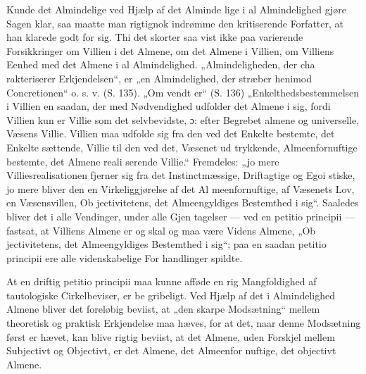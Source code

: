 \documentclass[12pt]{book}
\newcommand{\opage}[1]{\marginnote{\footnotesize\textit{[#1]}}}
\begin{document}
Kunde det Almindelige ved Hjælp af det Alminde\-%
lige i al Almindelighed gjøre Sagen klar, saa maatte
man rigtignok indrømme den kritiserende Forfatter, at
han klarede godt for sig. Thi det skorter saa vist ikke
paa varierende Forsikkringer om Villien i det Almene,
om det Almene i Villien, om Villiens Eenhed med det
Almene i al Almindelighed. „Almindeligheden, der cha\-%
rakteriserer Erkjendelsen“, er „en Almindelighed, der
stræber henimod Concretionen“ o. s. v. (S. 135). „Om\-%
vendt er“ (S. 136) „Enkelthedsbestemmelsen i Villien en
saadan, der med Nødvendighed udfolder det Almene i sig,
\opage{22}\setcounter{footnote}{0}%
fordi Villien kun er Villie som det selvbevidste, ɔ: efter
Begrebet almene og universelle, Væsens Villie. Villien
maa udfolde sig fra den ved det Enkelte bestemte, det
Enkelte sættende, Villie til den ved det, Væsenet ud\-%
trykkende, Almeenfornuftige bestemte, det Almene reali\-%
serende Villie.“ Fremdeles: „jo mere Villiesrealisationen
fjerner sig fra det Instinctmæssige, Driftagtige og Egoi\-%
stiske, jo mere bliver den en Virkeliggjørelse af det Al\-%
meenfornuftige, af Væsenets Lov, en Væsensvillen, Ob\-%
jectivitetens, det Almeengyldiges Bestemthed i sig“.
Saaledes bliver det i alle Vendinger, under alle Gjen\-%
tagelser --- ved en petitio principii --- fastsat, at Villiens
Almene er og skal og maa være Videns Almene, „Ob\-%
jectivitetens, det Almeengyldiges Bestemthed i sig“; paa
en saadan petitio principii ere alle videnskabelige For\-%
handlinger spildte.

At en driftig petitio principii maa kunne afføde en
rig Mangfoldighed af tautologiske Cirkelbeviser, er be\-%
gribeligt. Ved Hjælp af det i Almindelighed Almene
bliver det foreløbig beviist, at „den skarpe Modsætning“
mellem theoretisk og praktisk Erkjendelse maa hæves,
for at det, naar denne Modsætning først er hævet, kan
blive rigtig beviist, at det Almene, uden Forskjel mellem
Subjectivt og Objectivt, er det Almene, det Almeenfor\-%
nuftige, det objectivt Almene.
\end{document}
